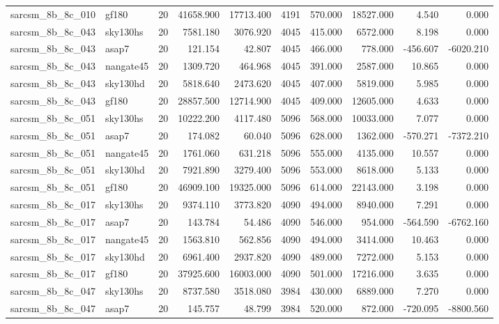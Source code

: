 \begin{longtable}{llrrrrrrrr}
sarcsm\_8b\_8c\_010 & gf180 & 20 & 41658.900 & 17713.400 & 4191 & 570.000 & 18527.000 & 4.540 & 0.000 \\
sarcsm\_8b\_8c\_043 & sky130hs & 20 & 7581.180 & 3076.920 & 4045 & 415.000 & 6572.000 & 8.198 & 0.000 \\
sarcsm\_8b\_8c\_043 & asap7 & 20 & 121.154 & 42.807 & 4045 & 466.000 & 778.000 & -456.607 & -6020.210 \\
sarcsm\_8b\_8c\_043 & nangate45 & 20 & 1309.720 & 464.968 & 4045 & 391.000 & 2587.000 & 10.865 & 0.000 \\
sarcsm\_8b\_8c\_043 & sky130hd & 20 & 5818.640 & 2473.620 & 4045 & 407.000 & 5819.000 & 5.985 & 0.000 \\
sarcsm\_8b\_8c\_043 & gf180 & 20 & 28857.500 & 12714.900 & 4045 & 409.000 & 12605.000 & 4.633 & 0.000 \\
sarcsm\_8b\_8c\_051 & sky130hs & 20 & 10222.200 & 4117.480 & 5096 & 568.000 & 10033.000 & 7.077 & 0.000 \\
sarcsm\_8b\_8c\_051 & asap7 & 20 & 174.082 & 60.040 & 5096 & 628.000 & 1362.000 & -570.271 & -7372.210 \\
sarcsm\_8b\_8c\_051 & nangate45 & 20 & 1761.060 & 631.218 & 5096 & 555.000 & 4135.000 & 10.557 & 0.000 \\
sarcsm\_8b\_8c\_051 & sky130hd & 20 & 7921.890 & 3279.400 & 5096 & 553.000 & 8618.000 & 5.133 & 0.000 \\
sarcsm\_8b\_8c\_051 & gf180 & 20 & 46909.100 & 19325.000 & 5096 & 614.000 & 22143.000 & 3.198 & 0.000 \\
sarcsm\_8b\_8c\_017 & sky130hs & 20 & 9374.110 & 3773.820 & 4090 & 494.000 & 8940.000 & 7.291 & 0.000 \\
sarcsm\_8b\_8c\_017 & asap7 & 20 & 143.784 & 54.486 & 4090 & 546.000 & 954.000 & -564.590 & -6762.160 \\
sarcsm\_8b\_8c\_017 & nangate45 & 20 & 1563.810 & 562.856 & 4090 & 494.000 & 3414.000 & 10.463 & 0.000 \\
sarcsm\_8b\_8c\_017 & sky130hd & 20 & 6961.400 & 2937.820 & 4090 & 489.000 & 7272.000 & 5.153 & 0.000 \\
sarcsm\_8b\_8c\_017 & gf180 & 20 & 37925.600 & 16003.000 & 4090 & 501.000 & 17216.000 & 3.635 & 0.000 \\
sarcsm\_8b\_8c\_047 & sky130hs & 20 & 8737.580 & 3518.080 & 3984 & 430.000 & 6889.000 & 7.270 & 0.000 \\
sarcsm\_8b\_8c\_047 & asap7 & 20 & 145.757 & 48.799 & 3984 & 520.000 & 872.000 & -720.095 & -8800.560 \\

\end{longtable}
